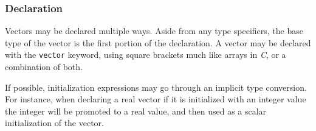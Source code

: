 \documentclass[../../gazprea.tex]{subfiles}
\begin{document}
		\subsubsection{Declaration}

			Vectors may be declared multiple ways. Aside from any type specifiers, the base type of the vector is the
			first portion of the declaration. A vector may be declared with the \texttt{vector} keyword, using square
			brackets much like arrays in \textit{C}, or a combination of both.

			If possible, initialization expressions may go through an implicit type conversion. For instance, when
			declaring a real vector if it is initialized with an integer value the integer will be promoted to a real
			value, and then used as a scalar initialization of the vector.
\end{document}
